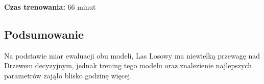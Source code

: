 \documentclass[12pt, a4paper]{report}
\begin{document}
\vspace{1em}

\noindent \textbf{Czas trenowania:}  
\large{66 minut}

\subsection{Podsumowanie}
    Na podstawie miar ewaluacji obu modeli, Las Losowy ma niewielką przewagę nad Drzewem decyzyjnym, jednak trening tego modelu oraz znalezienie najlepszych parametrów zająło blisko godzinę więcej.
\end{document}
